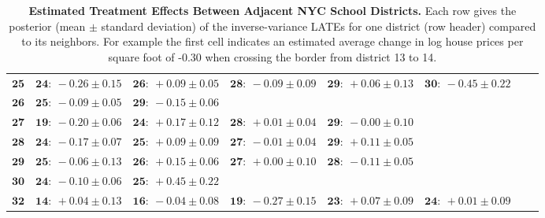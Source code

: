 \begin{sidewaystable}
\begin{tabular}{r|lllllll}
\( \mathbf{25} \)& \( \mathbf{24:}~-0.26 \pm 0.15 \)& \( \mathbf{26:}~+0.09 \pm 0.05 \)& \( \mathbf{28:}~-0.09 \pm 0.09 \)& \( \mathbf{29:}~+0.06 \pm 0.13 \)& \( \mathbf{30:}~-0.45 \pm 0.22 \)\\ 
\( \mathbf{26} \)& \( \mathbf{25:}~-0.09 \pm 0.05 \)& \( \mathbf{29:}~-0.15 \pm 0.06 \)\\ 
\( \mathbf{27} \)& \( \mathbf{19:}~-0.20 \pm 0.06 \)& \( \mathbf{24:}~+0.17 \pm 0.12 \)& \( \mathbf{28:}~+0.01 \pm 0.04 \)& \( \mathbf{29:}~-0.00 \pm 0.10 \)\\ 
\( \mathbf{28} \)& \( \mathbf{24:}~-0.17 \pm 0.07 \)& \( \mathbf{25:}~+0.09 \pm 0.09 \)& \( \mathbf{27:}~-0.01 \pm 0.04 \)& \( \mathbf{29:}~+0.11 \pm 0.05 \)\\ 
\( \mathbf{29} \)& \( \mathbf{25:}~-0.06 \pm 0.13 \)& \( \mathbf{26:}~+0.15 \pm 0.06 \)& \( \mathbf{27:}~+0.00 \pm 0.10 \)& \( \mathbf{28:}~-0.11 \pm 0.05 \)\\ 
\( \mathbf{30} \)& \( \mathbf{24:}~-0.10 \pm 0.06 \)& \( \mathbf{25:}~+0.45 \pm 0.22 \)\\ 
\( \mathbf{32} \)& \( \mathbf{14:}~+0.04 \pm 0.13 \)& \( \mathbf{16:}~-0.04 \pm 0.08 \)& \( \mathbf{19:}~-0.27 \pm 0.15 \)& \( \mathbf{23:}~+0.07 \pm 0.09 \)& \( \mathbf{24:}~+0.01 \pm 0.09 \)\\ 
            \hline
        \end{tabular}
        \caption{
            \label{table:NYC_pairwise}
            \textbf{Estimated Treatment Effects Between Adjacent NYC School Districts.}
            Each row gives the posterior (mean \(\pm\) standard deviation) of the inverse-variance LATEs for one district (row header) compared to its neighbors.
            For example the first cell indicates an estimated average change in log house prices per square foot of -0.30 when crossing the border from district 13 to 14.
        }
\end{sidewaystable}
